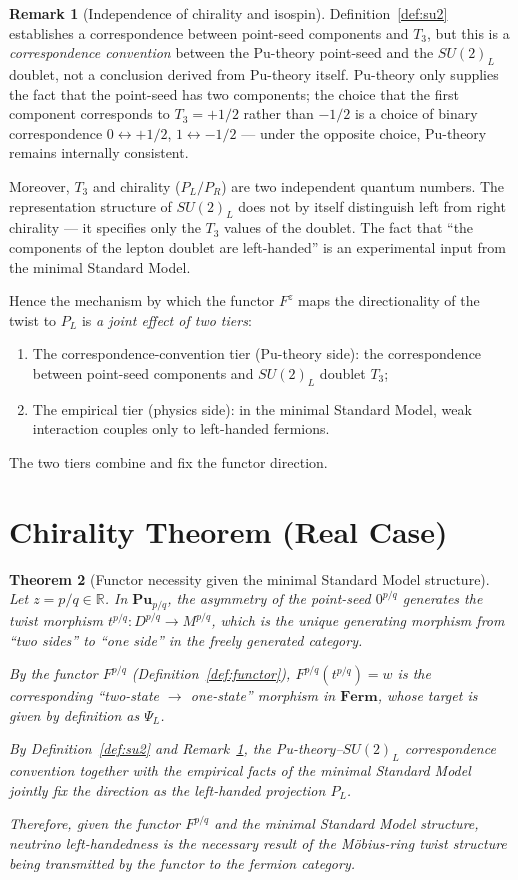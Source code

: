 \documentclass[11pt]{article}
\theoremstyle{plain}
\newtheorem{thm}{Theorem}[section]
\theoremstyle{definition}
\newtheorem{rem}[thm]{Remark}
\newcommand{\Cat}{\mathbf}
\begin{document}
\begin{rem}[Independence of chirality and isospin]\label{rem:independence}
Definition~\ref{def:su2} establishes a correspondence between point-seed
components and $T_3$, but this is a \emph{correspondence convention} between
the Pu-theory point-seed and the $SU(2)_L$ doublet, not a conclusion
derived from Pu-theory itself. Pu-theory only supplies the fact that the
point-seed has two components; the choice that the first component
corresponds to $T_3=+1/2$ rather than $-1/2$ is a choice of binary
correspondence $0\leftrightarrow +1/2$, $1\leftrightarrow -1/2$ --- under
the opposite choice, Pu-theory remains internally consistent.

Moreover, $T_3$ and chirality ($P_L/P_R$) are two independent quantum
numbers. The representation structure of $SU(2)_L$ does not by itself
distinguish left from right chirality --- it specifies only the $T_3$ values
of the doublet. The fact that ``the components of the lepton doublet are
left-handed'' is an experimental input from the minimal Standard Model.

Hence the mechanism by which the functor $F^z$ maps the directionality of
the twist to $P_L$ is \emph{a joint effect of two tiers}:
\begin{enumerate}
\item The correspondence-convention tier (Pu-theory side): the
correspondence between point-seed components and $SU(2)_L$ doublet $T_3$;
\item The empirical tier (physics side): in the minimal Standard Model,
weak interaction couples only to left-handed fermions.
\end{enumerate}
The two tiers combine and fix the functor direction.
\end{rem}

\section{Chirality Theorem (Real Case)}

\begin{thm}[Functor necessity given the minimal Standard Model structure]\label{thm:main}
Let $z = p/q\in\mathbb{R}$. In $\Cat{Pu}_{p/q}$, the asymmetry of the
point-seed $0^{p/q}$ generates the twist morphism
$t^{p/q}: D^{p/q}\to M^{p/q}$, which is the unique generating morphism from
``two sides'' to ``one side'' in the freely generated category.

By the functor $F^{p/q}$ (Definition~\ref{def:functor}),
$F^{p/q}(t^{p/q}) = w$ is the corresponding ``two-state $\to$ one-state''
morphism in $\Cat{Ferm}$, whose target is given by definition as $\Psi_L$.

By Definition~\ref{def:su2} and Remark~\ref{rem:independence}, the
Pu-theory--$SU(2)_L$ correspondence convention together with the empirical
facts of the minimal Standard Model jointly fix the direction as the
left-handed projection $P_L$.

Therefore, given the functor $F^{p/q}$ and the minimal Standard Model
structure, neutrino left-handedness is the necessary result of the
M\"obius-ring twist structure being transmitted by the functor to the
fermion category.
\end{thm}
\end{document}
